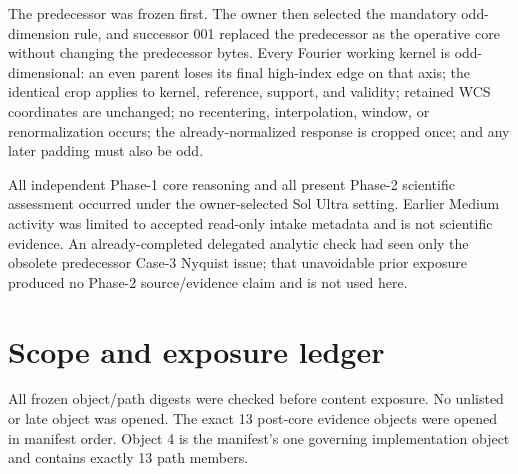 \documentclass[10pt]{article}
\begin{document}
The predecessor was frozen first.  The owner then selected the mandatory
odd-dimension rule, and successor 001 replaced the predecessor as the
operative core without changing the predecessor bytes.  Every Fourier working
kernel is odd-dimensional: an even parent loses its final high-index edge on
that axis; the identical crop applies to kernel, reference, support, and
validity; retained WCS coordinates are unchanged; no recentering,
interpolation, window, or renormalization occurs; the already-normalized
response is cropped once; and any later padding must also be odd.

All independent Phase-1 core reasoning and all present Phase-2 scientific
assessment occurred under the owner-selected Sol Ultra setting.  Earlier
Medium activity was limited to accepted read-only intake metadata and is not
scientific evidence.  An already-completed delegated analytic check had seen
only the obsolete predecessor Case-3 Nyquist issue; that unavoidable prior
exposure produced no Phase-2 source/evidence claim and is not used here.

\section{Scope and exposure ledger}

All frozen object/path digests were checked before content exposure.  No
unlisted or late object was opened.  The exact 13 post-core evidence objects
were opened in manifest order.  Object 4 is the manifest's one governing
implementation object and contains exactly 13 path members.
\end{document}
